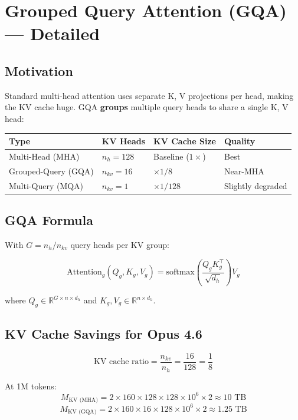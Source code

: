 \documentclass[11pt,a4paper]{article}
\begin{document}
\section{Grouped Query Attention (GQA) --- Detailed}

\subsection{Motivation}

Standard multi-head attention uses separate K, V projections per head, making the KV cache huge. GQA \textbf{groups} multiple query heads to share a single K, V head:

\begin{center}
\begin{tabular}{llll}
\toprule
\textbf{Type} & \textbf{KV Heads} & \textbf{KV Cache Size} & \textbf{Quality} \\
\midrule
Multi-Head (MHA) & $n_h = 128$ & Baseline ($1\times$) & Best \\
Grouped-Query (GQA) & $n_{kv} = 16$ & $\times 1/8$ & Near-MHA \\
Multi-Query (MQA) & $n_{kv} = 1$ & $\times 1/128$ & Slightly degraded \\
\bottomrule
\end{tabular}
\end{center}

\subsection{GQA Formula}

With $G = n_h / n_{kv}$ query heads per KV group:

$$\text{Attention}_g(Q_g, K_g, V_g) = \text{softmax}\!\left(\frac{Q_g K_g^\top}{\sqrt{d_h}}\right) V_g$$

where $Q_g \in \mathbb{R}^{G \times n \times d_h}$ and $K_g, V_g \in \mathbb{R}^{n \times d_h}$.

\subsection{KV Cache Savings for Opus 4.6}

$$\text{KV cache ratio} = \frac{n_{kv}}{n_h} = \frac{16}{128} = \frac{1}{8}$$

At 1M tokens:
$$M_{\text{KV (MHA)}} = 2 \times 160 \times 128 \times 128 \times 10^6 \times 2 \approx 10 \text{ TB}$$
$$M_{\text{KV (GQA)}} = 2 \times 160 \times 16 \times 128 \times 10^6 \times 2 \approx 1.25 \text{ TB}$$
\end{document}
